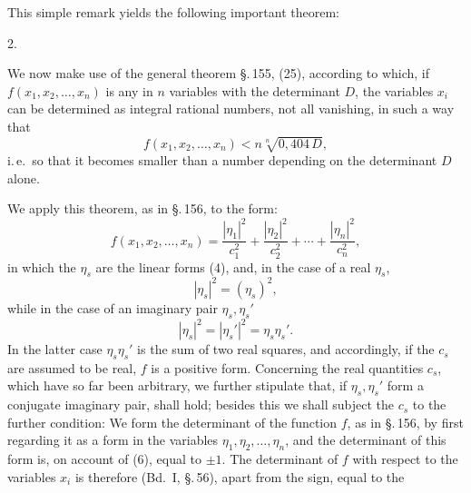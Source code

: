 This simple remark yields the following important theorem:

2. 

We now make use of the general theorem \S.\,155, (25), according to which, if $f(x_1,x_2,\dots,x_n)$ is any  in $n$ variables with the determinant $D$, the variables $x_i$ can be determined as integral rational numbers, not all vanishing, in such a way that
\[
f(x_1,x_2,\dots,x_n) < n\sqrt[n]{0{,}404\,D},
\]
i.\,e.\ so that it becomes smaller than a number depending on the determinant $D$ alone.

We apply this theorem, as in \S.\,156, to the form:
\[
f(x_1,x_2,\dots,x_n) = \frac{|\eta_1|^2}{c_1^2} + \frac{|\eta_2|^2}{c_2^2} + \cdots + \frac{|\eta_n|^2}{c_n^2},
\]
in which the $\eta_s$ are the linear forms (4), and, in the case of a real $\eta_s$,
\[
|\eta_s|^2 = (\eta_s)^2,
\]
while in the case of an imaginary pair $\eta_s, \eta_s'$
\[
|\eta_s|^2 = |\eta_s'|^2 = \eta_s\eta_s'.
\]
In the latter case $\eta_s\eta_s'$ is the sum of two real squares, and accordingly, if the $c_s$ are assumed to be real, $f$ is a positive form. Concerning the real quantities $c_s$, which have so far been arbitrary, we further stipulate that, if $\eta_s, \eta_s'$ form a conjugate imaginary pair,
shall hold; besides this we shall subject the $c_s$ to the further condition:
We form the determinant of the function $f$, as in \S.\,156, by first regarding it as a form in the variables $\eta_1, \eta_2, \dots, \eta_n$, and the determinant of this form is, on account of (6), equal to $\pm 1$. The determinant of $f$ with respect to the variables $x_i$ is therefore (Bd.\ I, \S.\,56), apart from the sign, equal to the
